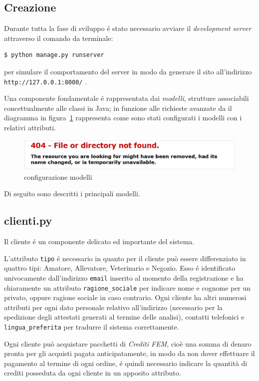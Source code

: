 \subsection{Creazione}
\label{subs:crea}
Durante tutta la fase di sviluppo é stato necessario avviare il \emph{development server} attraverso il comando da terminale:
\begin{verbatim}
$ python manage.py runserver
\end{verbatim}
per simulare il comportamento del server in modo da generare il sito all'indirizzo \texttt{http://127.0.0.1:8000/} .

Una componente fondamentale é rappresentata dai \emph{modelli}, strutture associabili concettualmente alle classi in Java; in funzione alle richieste avanzate da {\fem} il diagramma in figura~\ref{fig:modelli} rappresenta come sono stati configurati i modelli con i relativi attributi.

\begin{figure}
 \includegraphics[width=1\textwidth]{images/filenotfound} 
 \caption{configurazione modelli}
 \label{fig:modelli}
\end{figure}

Di seguito sono descritti i principali modelli.

\subsection*{clienti.py}
\label{subs:clienti}
Il cliente é un componente delicato ed importante del sistema. 

L'attributo \texttt{tipo} é necessario in quanto per {\fem} il cliente può essere differenziato in quattro tipi: Amatore, Allevatore, Veterinario e Negozio. Esso é identificato univocamente dall'indirizzo \texttt{email} inserito al momento della registrazione e ha chiaramente un attributo \texttt{ragione\_sociale} per indicare nome e cognome per un privato, oppure ragione sociale in caso contrario. Ogni cliente ha altri numerosi attributi per ogni dato personale relativo all'indirizzo (necessario per la spedizione degli attestati generati al termine delle analisi), contatti telefonici e \texttt{lingua\_preferita} per tradurre il sistema correttamente.

Ogni cliente può acquistare pacchetti di \emph{Crediti FEM}, cioè una somma di denaro pronta per gli acquisti pagata anticipatamente, in modo da non dover effettuare il pagamento al termine di ogni ordine, é quindi necessario indicare la quantità di crediti posseduta da ogni cliente in un apposito attributo.

